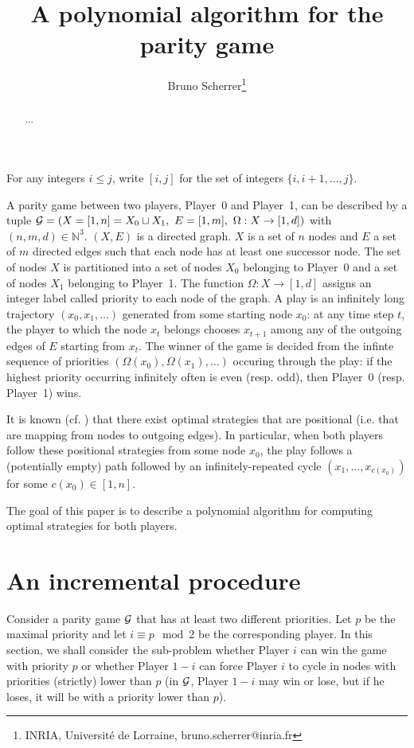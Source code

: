 \documentclass{article}
\title{A polynomial algorithm for the parity game}
\author{Bruno Scherrer\footnote{INRIA, Universit\'e de Lorraine, bruno.scherrer@inria.fr}}
\def\N{\mathbb N}
\def\G{{\cal G}}
\def\pa{Player~0}
\def\pb{Player~1}
\begin{document}
\maketitle

\begin{abstract}
  ...
\end{abstract}


For any integers $i \le j$, write $[i,j]$ for the set of integers $\{i,i+1,\dots,j\}$.

A parity game between two players, \pa{ }and \pb, can be described by a tuple $\G=(X=[1,n]=X_0 \sqcup X_1,~ E=[1,m],~ \Omega:X \to [1,d])$ with $(n,m,d) \in \N^3$.
$(X,E)$ is a directed graph. $X$ is a set of $n$ nodes and $E$ a set of $m$ directed edges such that each node has at least one successor node. 
The set of nodes  $X$ is partitioned into a set of nodes $X_0$ belonging to \pa{ }and a set of nodes $X_1$ belonging to \pb. The function $\Omega:X \to [1,d]$ assigns an integer label called priority to each node of the graph.
A play is an infinitely long trajectory $(x_0,x_1,\dots)$ generated from some starting node $x_0$: at any time step $t$, the player to which the node $x_t$ belongs chooses $x_{t+1}$ among any of the outgoing edges of $E$ starting from $x_t$. The winner of the game is decided from the infinte sequence of priorities $(\Omega(x_0),\Omega(x_1),\dots)$ occuring through the play: if the highest priority occurring infinitely often is even (resp. odd), then \pa{ }(resp. \pb) wins.

It is known (cf. \citet{zielonka98}) that there exist optimal strategies that are positional (i.e. that are mapping from nodes to outgoing edges). In particular, when both players follow these positional strategies from some node $x_0$, the play follows a (potentially empty) path followed by an infinitely-repeated cycle $(x_1,\dots,x_{c(x_0)})$ for some $c(x_0) \in [1,n]$.

The goal of this paper is to describe a polynomial algorithm for computing optimal strategies for both players.


\section{An incremental procedure}

Consider a parity game $\G$ that has at least two different priorities. Let $p$ be the maximal priority and let $i \equiv p \mod 2$ be the corresponding player. 
In this section, we shall consider the sub-problem whether Player $i$ can win the game with priority $p$ or whether Player $1-i$ can force Player $i$ to cycle in nodes with priorities (strictly) lower than $p$ (in $\G$, Player $1-i$ may win or lose, but if he loses, it will be with a priority lower than $p$).
\end{document}
